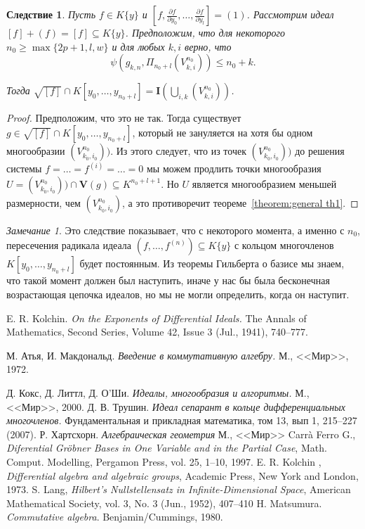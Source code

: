 \documentclass[16pt]{article}
\renewcommand{\ge}{\geqslant} %
\theoremstyle{plain1}
\theoremstyle{plain2}
\theoremstyle{plain}
\theoremstyle{plain3}
\newtheorem{corollary}[theorem1]{Следствие}
\theoremstyle{definition}
\theoremstyle{remark}
\newtheorem{remark}[theorem1]{Замечание}
\begin{document}
\begin{corollary}
Пусть $f\in K\{y\}$ и $\left[f,\frac{\partial f}{\partial y_0},\ldots,\frac{\partial f}{\partial y_l}\right]=(1)$. Рассмотрим идеал $[f]+(f)=[f]\subseteq K\{y\}$. Предположим, что для некоторого  $n_0\ge\max\{2p+1,l,w\}$  и для любых $k,i$ верно, что 
$$
\psi(g_{k,n},\Pi_{n_0+l}(V^{n_0}_{k,i}))\leqslant n_0+k.
$$ 

Тогда $\sqrt{[f]}\cap K[y_0,\ldots,y_{n_0+l}]=\mathbf{I}(\bigcup\limits_{i,k}(V^{n_0}_{k,i}))$.
\end{corollary}

\begin{proof}
Предположим, что это не так. Тогда существует $g\in \sqrt{[f]}\cap K[y_0,\ldots,y_{n_0+l}]$, который не зануляется на хотя бы одном многообразии $(V^{n_0}_{k_0,i_0}))$. Из этого следует, что из точек  $(V^{n_0}_{k_0,i_0}))$ до решения системы $f=\ldots=f^{(i)}=\ldots=0$ мы можем продлить точки многообразия $U=(V^{n_0}_{k_0,i_0}))\cap \mathbf{V}(g)\subseteq K^{n_0+l+1}$. Но $U$ является многообразием меньшей размерности, чем $(V^{n_0}_{k_0,i_0})$, а это противоречит теореме~\ref{theorem:general th1}.
\end{proof}
\begin{remark}
Это следствие показывает, что с некоторого момента, а именно с $n_0$,  пересечения  радикала идеала $(f,\ldots,f^{(n)})\subseteq K\{y\}$ с кольцом многочленов $K[y_0,\ldots,y_{n_0+l}]$ будет постоянным. Из теоремы Гильберта о базисе мы знаем,  что такой момент должен был наступить, иначе у нас бы была бесконечная возрастающая цепочка идеалов, но мы не могли определить, когда он наступит.  
\end{remark}

\begin{thebibliography}{99}

E. R. Kolchin.
\emph{On the Exponents of Differential Ideals.}
The Annals of Mathematics, Second Series, Volume 42, Issue 3 (Jul., 1941), 740--777.

М. Атья, И. Макдональд.
\emph{Введение в коммутативную алгебру.} М., <<Мир>>, 1972.

Д. Кокс, Д. Литтл, Д. О'Ши.
\emph{Идеалы, многообразия и алгоритмы.}
М., <<Мир>>, 2000.
Д. В. Трушин.
\emph{Идеал сепарант в кольце дифференциальных многочленов.}
Фундаментальная и прикладная математика, том 13, вып 1, 215--227 (2007).
Р. Хартсхорн.
\emph{Алгебраическая геометрия}
М., <<Мир>>
Carr\`a Ferro G.,
\emph{Diferential Gr\"{o}bner Bases in One Variable and in the Partial Case},
Math. Comput. Modelling, Pergamon Press, vol. 25, 1--10, 1997.
E. R. Kolchin ,
\emph{Differential algebra and algebraic groups}, Academic Press, New York and London, 1973.
S. Lang,
\emph{Hilbert's Nullstellensatz in Infinite-Dimensional Space}, American Mathematical Society, vol. 3, No. 3 (Jun., 1952), 407--410
H. Matsumura.
\emph{Commutative algebra}.
Benjamin/Cummings, 1980.
\end{thebibliography}
\end{document}
